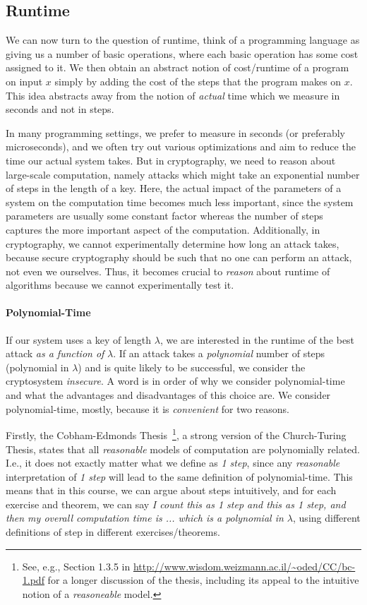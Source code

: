 
\subsection{Runtime}\label{ssec:runtime}
We can now turn to the question of runtime, think of a programming language as giving us a number of basic operations, where each basic operation has some cost assigned to it. We then obtain an abstract notion of cost/runtime of a program on input $x$ simply by adding the cost of the steps that the program makes on $x$. This idea abstracts away from the notion of \emph{actual} time which we measure in seconds and not in steps. 

In many programming settings, we prefer to measure in seconds (or preferably microseconds), and we often try out various optimizations and aim to reduce the time our actual system takes. But in cryptography, we need to reason about large-scale computation, namely attacks which might take an exponential number of steps in the length of a key. Here, the actual impact of the parameters of a system on the computation time becomes much less important, since the system parameters are usually some constant factor whereas the number of steps captures the more important aspect of the computation. Additionally, in cryptography, we cannot experimentally determine how long an attack takes, because secure cryptography should be such that no one can perform an attack, not even we ourselves. Thus, it becomes crucial to \emph{reason} about runtime of algorithms because we cannot experimentally test it.

\paragraph{Polynomial-Time} If our system uses a key of length $\lambda$, we are interested in the runtime of the best attack \emph{as a function of} $\lambda$. If an attack takes a \emph{polynomial} number of steps (polynomial in $\lambda$) and is quite likely to be successful, we consider the cryptosystem \emph{insecure}. A word is in order of why we consider polynomial-time and what the advantages and disadvantages of this choice are. We consider polynomial-time, mostly, because it is \emph{convenient} for two reasons. 

Firstly, the Cobham-Edmonds Thesis~\footnote{See, e.g., Section 1.3.5 in \url{http://www.wisdom.weizmann.ac.il/~oded/CC/bc-1.pdf} for a longer discussion of the thesis, including its appeal to the intuitive notion of a \emph{reasoneable} model.}, a strong version of the Church-Turing Thesis, states that all \emph{reasonable} models of computation are polynomially related. I.e., it does not exactly matter what we define as \emph{1 step}, since any \emph{reasonable} interpretation of \emph{1 step} will lead to the same definition of polynomial-time. This means that in this course, we can argue about steps intuitively, and for each exercise and theorem, we can say \emph{I count this as 1 step and this as 1 step, and then my overall computation time is ... which is a polynomial in $\lambda$}, using different definitions of step in different exercises/theorems.

